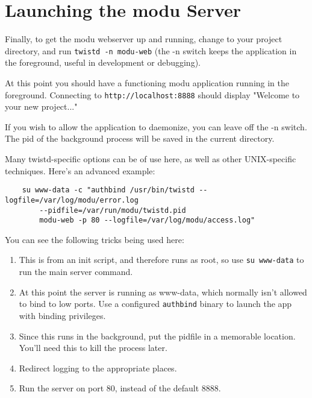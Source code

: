 \section{Launching the modu Server}

Finally, to get the modu webserver up and running, change to your project
directory, and run \verb|twistd -n modu-web| (the -n switch keeps the
application in the foreground, useful in development or debugging).

At this point you should have a functioning modu application running in the
foreground. Connecting to \verb|http://localhost:8888| should display
"Welcome to your new project..."

If you wish to allow the application to daemonize, you can leave off the -n
switch. The pid of the background process will be saved in the current directory.

Many twistd-specific options can be of use here, as well as other UNIX-specific
techniques. Here's an advanced example:

\begin{verbatim}
    su www-data -c "authbind /usr/bin/twistd --logfile=/var/log/modu/error.log
        --pidfile=/var/run/modu/twistd.pid
        modu-web -p 80 --logfile=/var/log/modu/access.log"
\end{verbatim}

You can see the following tricks being used here:

\begin{flushleft}
\begin{enumerate}
    \item This is from an init script, and therefore runs as root, so use
        \verb|su www-data| to run the main server command.
    \item At this point the server is running as www-data, which normally
        isn't allowed to bind to low ports. Use a configured \verb|authbind|
        binary to launch the app with binding privileges.
    \item Since this runs in the background, put the pidfile in a memorable
        location. You'll need this to kill the process later.
    \item Redirect logging to the appropriate places.
    \item Run the server on port 80, instead of the default 8888.
\end{enumerate}
\end{flushleft}


